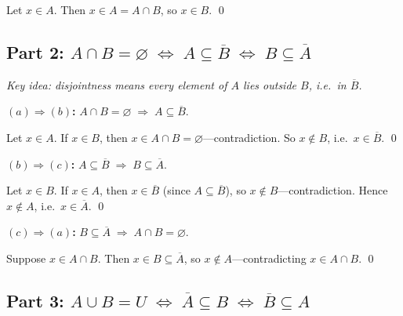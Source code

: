 \documentclass[12pt, a4paper]{article}
\newcommand{\comp}[1]{\overline{#1}}
\begin{document}
Let $x \in A$. Then $x \in A = A \cap B$, so $x \in B$. \qed

\subsection*{Part 2:\; $A \cap B = \varnothing \;\iff\; A \subseteq \comp{B} \;\iff\; B \subseteq \comp{A}$}

\begin{center}
\end{center}

\smallskip
\textit{Key idea: disjointness means every element of $A$ lies outside $B$, i.e.\ in $\comp{B}$.}

\smallskip
\textbf{$(a) \Rightarrow (b)$:}\;
$A \cap B = \varnothing \;\Longrightarrow\; A \subseteq \comp{B}$.

Let $x \in A$. If $x \in B$, then $x \in A \cap B = \varnothing$---contradiction.
So $x \notin B$, i.e.\ $x \in \comp{B}$. \qed

\textbf{$(b) \Rightarrow (c)$:}\;
$A \subseteq \comp{B} \;\Longrightarrow\; B \subseteq \comp{A}$.

Let $x \in B$. If $x \in A$, then $x \in \comp{B}$ (since $A \subseteq \comp{B}$),
so $x \notin B$---contradiction. Hence $x \notin A$, i.e.\ $x \in \comp{A}$. \qed

\textbf{$(c) \Rightarrow (a)$:}\;
$B \subseteq \comp{A} \;\Longrightarrow\; A \cap B = \varnothing$.

Suppose $x \in A \cap B$. Then $x \in B \subseteq \comp{A}$,
so $x \notin A$---contradicting $x \in A \cap B$. \qed

\subsection*{Part 3:\; $A \cup B = U \;\iff\; \comp{A} \subseteq B \;\iff\; \comp{B} \subseteq A$}
\end{document}
